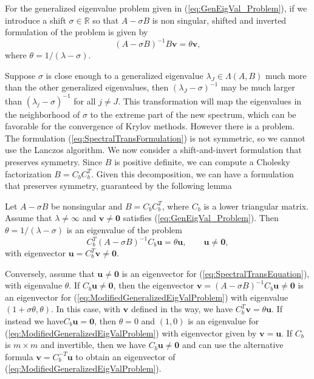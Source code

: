 For the generalized eigenvalue problem given in (\ref{eq:GenEigVal_Problem}), if we introduce a shift $\sigma \in \mathbb{R}$ so that $A - \sigma B$ is non singular,  shifted and inverted formulation of the problem is given by
\begin{equation}\label{eq:SpectralTransFormulation}
	(A - \sigma B)^{-1} B\mathbf{v} = \theta \mathbf{v},
\end{equation}
where $\theta = 1 / (\lambda - \sigma)$.  

Suppose $\sigma$ is close enough to a generalized eigenvalue $\lambda_J \in \Lambda(A, B)$ much more than the other generalized eigenvalues, then $(\lambda_J - \sigma)^{-1}$ may be much larger than $(\lambda_j - \sigma)^{-1}$ for all $j \neq J$. This transformation will map the eigenvalues in the neighborhood of $\sigma$ to the extreme part of the new spectrum, which can be favorable for the convergence of Krylov methods.  However there is a problem.  The formulation (\ref{eq:SpectralTransFormulation}) is not symmetric, so we cannot use the Lanczos algorithm.  We now consider a shift-and-invert formulation that preserves symmetry. Since $B$ is positive definite, we can compute a Cholesky factorization $B = C_bC_b^T$. Given this decomposition, we can have a formulation that preserves symmetry, guaranteed by the following lemma
 \begin{lemma}\label{lemma:SpectralTransLemma}
 	Let $A-\sigma B$ be nonsingular and $B = C_bC_b^T$, where $C_b$ is a lower triangular matrix. Assume that $\lambda \neq \infty$ and $\mathbf{v} \neq \mathbf{0}$ satisfies (\ref{eq:GenEigVal_Problem}). Then $\theta = 1/(\lambda - \sigma)$  is an eigenvalue of the problem
 	\begin{equation}\label{eq:SpectralTransEquation}
 		C_b^T(A-\sigma B)^{-1}C_b \mathbf{u} = \theta \mathbf{u}, \qquad \mathbf{u} \neq \mathbf{0},
 	\end{equation}
 	with eigenvector $\mathbf{u} = C_b^T\mathbf{v} \neq \mathbf{0}$.
 	
 	Conversely, assume that $\mathbf{u} \neq \mathbf{0}$ is an eigenvector for (\ref{eq:SpectralTransEquation}), with eigenvalue $\theta$. If $C_b\mathbf{u} \neq \mathbf{0}$, then the eigenvector $\mathbf{v} = (A -\sigma B)^{-1}C_b\mathbf{u} \neq \mathbf{0}$ is an eigenvector for (\ref{eq:ModifiedGeneralizedEigValProblem}) with eigenvalue $(1+\sigma \theta, \theta)$. In this case, with $\mathbf{v}$ defined in ths way, we have $C_b^T\mathbf{v} = \theta \mathbf{u}$. If instead we have$C_b\mathbf{u} = \mathbf{0}$, then $\theta = 0$ and $(1, 0)$ is an eigenvalue for (\ref{eq:ModifiedGeneralizedEigValProblem}) with eigenvector given by $\mathbf{v} = \mathbf{u}$. If $C_b$ is $m \times m$ and invertible, then we have $C_b\mathbf{u} \neq \mathbf{0}$ and can use the alternative formula $\mathbf{v} = C_b^{-T}\mathbf{u}$ to obtain an eigenvector of (\ref{eq:ModifiedGeneralizedEigValProblem}).
 \end{lemma}
